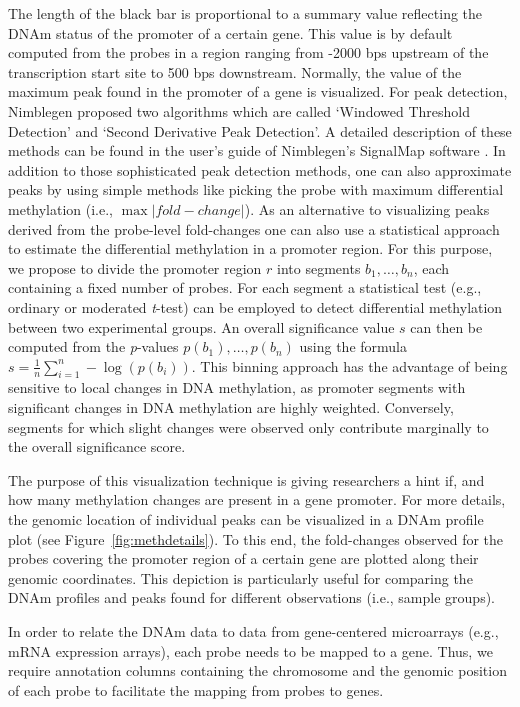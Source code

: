 \documentclass{bioinfo}
\begin{document}
The length of the black bar is proportional to a summary value reflecting the DNAm status of the
promoter of a certain gene.  This value is by default computed from the probes in a region ranging
from -2000 bps upstream of the transcription start site to 500 bps downstream. Normally, the
value of the maximum peak found in the promoter of a gene is visualized. For peak detection,
Nimblegen proposed two algorithms which are called `Windowed Threshold Detection' and
`Second Derivative Peak Detection'. A detailed description of these methods can be found in the
user's guide of Nimblegen's SignalMap software \citep[see][]{NimblegenSignalMapUserGuide}.
In addition to those sophisticated peak detection methods, one can also approximate peaks by
using simple methods like picking the probe with maximum differential methylation (i.e., $\max|fold-change|$).
As an alternative to visualizing peaks derived from the probe-level fold-changes one can also use a statistical
approach to estimate the differential methylation in a promoter region. For this purpose, we
propose to divide the promoter region $r$ into segments $b_1,\dots,b_n$, each containing a fixed number of probes.
For each segment a statistical test (e.g., ordinary or moderated \emph{t}-test) can be employed to detect
differential methylation between two experimental groups. An overall significance value $s$ can then be computed
from the \emph{p}-values $p(b_1),\dots,p(b_n)$ using the formula $s=\frac{1}{n}\sum\limits_{i=1}^n-\log(p(b_i))$.
This binning approach has the advantage of being sensitive to local changes in DNA methylation, as promoter segments with
significant changes in DNA methylation are highly weighted. Conversely, segments for which slight changes were observed only
contribute marginally to the overall significance score.

The purpose of this visualization technique is giving researchers a hint if,
and how many methylation changes are present in a gene promoter.
For more details, the genomic location of individual peaks can be visualized in a DNAm profile plot
(see Figure~\ref{fig:methdetails}). To this end, the fold-changes observed for the probes
covering the promoter region of a certain gene are plotted along their genomic coordinates. This
depiction is particularly useful for comparing the DNAm profiles and peaks found for different
observations (i.e., sample groups).

In order to relate the DNAm data to data from gene-centered microarrays (e.g., mRNA expression
arrays), each probe needs to be mapped to a gene. Thus, we require annotation columns containing the
chromosome and the genomic position of each probe to facilitate the mapping from probes to genes.
\end{document}

